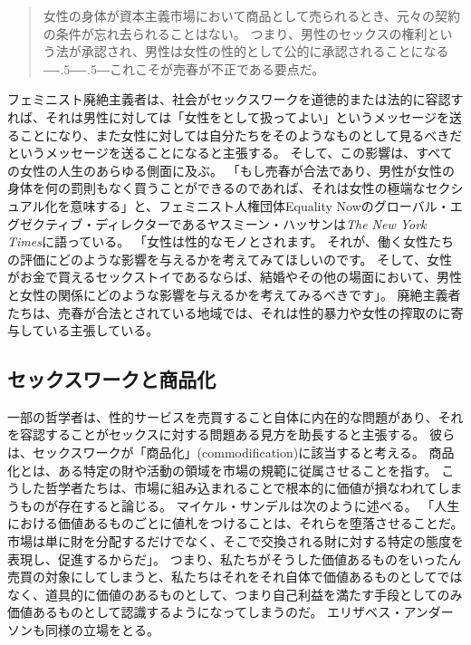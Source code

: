 \documentclass[paper=a4,book,openany]{jlreq}
\newcommand{\ig}[1]{}           %
\def\DDASH{―\kern-.5\zw―\kern-.5\zw―}
\begin{document}
\begin{quote}
女性の身体が資本主義市場において商品として売られるとき、元々の契約の条件が忘れ去られることはない。
つまり、男性のセックスの権利という法が承認され、男性は女性の性的として公的に承認されることになる{\DDASH}これこそが売春が不正である要点だ。
\citep[p.208]{pateman88:_sexual_contr}
\end{quote}

フェミニスト廃絶主義者は、社会がセックスワークを道徳的または法的に容認すれば、それは男性に対しては「女性をとして扱ってよい」というメッセージを送ることになり、また女性に対しては自分たちをそのようなものとして見るべきだというメッセージを送ることになると主張する。
そして、この影響は、すべての女性の人生のあらゆる側面に及ぶ。
「もし売春が合法であり、男性が女性の身体を何の罰則もなく買うことができるのであれば、それは女性の極端なセクシュアル化を意味する」と、フェミニスト人権団体Equality Nowのグローバル・エグゼクティブ・ディレクターであるヤスミーン・ハッサンは\emph{The New York Times}に語っている。
「女性は性的なモノとされます。
それが、働く女性たちの評価にどのような影響を与えるかを考えてみてほしいのです。
そして、女性がお金で買えるセックストイであるならば、結婚やその他の場面において、男性と女性の関係にどのような影響を与えるかを考えてみるべきです」\citep{bazelon16:_shoul_prost_be_crime}。
廃絶主義者たちは、売春が合法とされている地域では、それは性的暴力や女性の搾取のに寄与している主張している\citep[p.3]{waltman10:_prohib_purch_sex_sweden}。

\subsection{セックスワークと商品化}

一部の哲学者は、性的サービスを売買すること自体に内在的な問題があり、それを容認することがセックスに対する問題ある見方を助長すると主張する。
彼らは、セックスワークが「商品化」(commodification)に該当すると考える。
商品化とは、ある特定の財や活動の領域を市場の規範に従属させることを指す。
こうした哲学者たちは、市場に組み込まれることで根本的に価値が損なわれてしまうものが存在すると論じる。
マイケル・サンデルは次のように述べる。
「人生における価値あるものごとに値札をつけることは、それらを堕落させることだ。
市場は単に財を分配するだけでなく、そこで交換される財に対する特定の態度を表現し、促進するからだ」\citep[p.9]{sandel12:money_cant_buy}。
つまり、私たちがそうした価値あるものをいったん売買の対象にしてしまうと、私たちはそれをそれ自体で価値あるものとしてではなく、道具的に価値のあるものとして、つまり自己利益を満たす手段としてのみ価値あるものとして認識するようになってしまうのだ。
エリザベス・アンダーソン\ig{Elizabeth Anderson}も同様の立場をとる。
\end{document}
